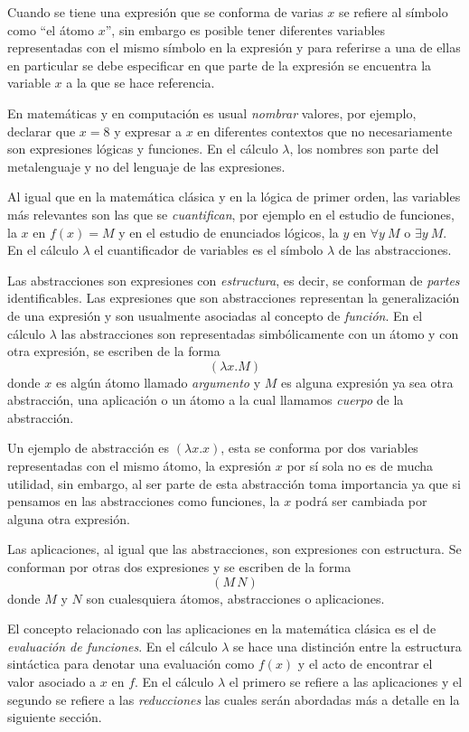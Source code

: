 Cuando se tiene una expresión que se conforma de varias $ x $ se refiere al símbolo como ``el átomo $ x $'', sin embargo es posible tener diferentes variables representadas con el mismo símbolo en la expresión y para referirse a una de ellas en particular se debe especificar en que parte de la expresión se encuentra la variable $ x $ a la que se hace referencia.

En matemáticas y en computación es usual \emph{nombrar} valores, por ejemplo, declarar que $ x = 8 $ y expresar a $ x $ en diferentes contextos que no necesariamente son expresiones lógicas y funciones. En el cálculo $ λ $, los nombres son parte del metalenguaje y no del lenguaje de las expresiones.

Al igual que en la matemática clásica y en la lógica de primer orden, las variables más relevantes son las que se \emph{cuantifican}, por ejemplo en el estudio de funciones, la $ x $ en $ f(x) = M $ y en el estudio de enunciados lógicos, la $ y $ en $ \forall y\ M $ o $ \exists y\ M $. En el cálculo $ λ $ el cuantificador de variables es el símbolo $ λ $ de las abstracciones.

Las abstracciones son expresiones con \emph{estructura}, es decir, se conforman de \emph{partes} identificables. Las expresiones que son abstracciones representan la generalización de una expresión y son usualmente asociadas al concepto de \emph{función}. En el cálculo $ λ $ las abstracciones son representadas simbólicamente con un átomo y con otra expresión, se escriben de la forma
\[ (λx.M) \]
donde $ x $ es algún átomo llamado \emph{argumento} y $ M $ es alguna expresión ya sea otra abstracción, una aplicación o un átomo a la cual llamamos \emph{cuerpo} de la abstracción.

Un ejemplo de abstracción es $ (λx.x) $, esta se conforma por dos variables representadas con el mismo átomo, la expresión $ x $ por sí sola no es de mucha utilidad, sin embargo, al ser parte de esta abstracción toma importancia ya que si pensamos en las abstracciones como funciones, la $ x $ podrá ser cambiada por alguna otra expresión.

Las aplicaciones, al igual que las abstracciones, son expresiones con estructura. Se conforman por otras dos expresiones y se escriben de la forma
\[ (M\, N) \]
donde $ M $ y $ N $ son cualesquiera átomos, abstracciones o aplicaciones.

El concepto relacionado con las aplicaciones en la matemática clásica es el de \emph{evaluación de funciones}. En el cálculo $ λ $ se hace una distinción entre la estructura sintáctica para denotar una evaluación como $ f(x) $ y el acto de encontrar el valor asociado a $ x $ en $ f $. En el cálculo $ λ $ el primero se refiere a las aplicaciones y el segundo se refiere a las \emph{reducciones} las cuales serán abordadas más a detalle en la siguiente sección.

